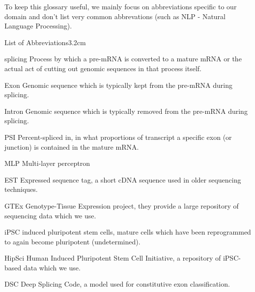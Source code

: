 To keep this glossary useful, we mainly focus on abbreviations specific to our domain and don't list very common abbrevations (such as NLP - Natural Language Processing).
\begin{mclistof}{List of Abbreviations}{3.2cm}

\item[splicing] Process by which a pre-mRNA is converted to a mature mRNA or the actual act of cutting out genomic sequences in that process itself.
\item[Exon] Genomic sequence which is typically kept from the pre-mRNA during splicing.
\item[Intron] Genomic sequence which is typically removed from the pre-mRNA during splicing.
\item[PSI] Percent-spliced in, in what proportions of transcript a specific exon (or junction) is contained in the mature mRNA.
\item[MLP] Multi-layer perceptron
\item[EST] Expressed sequence tag, a short cDNA sequence used in older sequencing techniques.
\item[GTEx] Genotype-Tissue Expression project, they provide a large repository of sequencing data which we use.

\item[iPSC] induced pluripotent stem cells, mature cells which have been reprogrammed to again become pluripotent (undetermined).
\item[HipSci] Human Induced Pluripotent Stem Cell Initiative, a repository of iPSC-based data which we use.

\item[DSC] Deep Splicing Code, a model used for constitutive exon classification.



\end{mclistof} 

